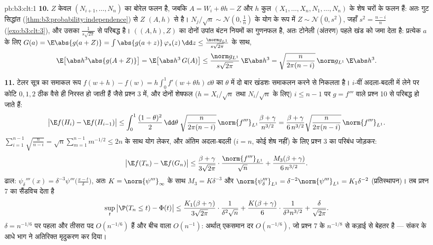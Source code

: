 \begin{solution}{pb:b3:clt:1}
\textbf{10.} $Z$ केवल $(N_{i+1}, \dots, N_n)$ का बोरेल फलन
है, जबकि $A = W_i + \theta h - Z$ और $h$  कुल
$(X_1, \dots, X_n, N_1, \dots, N_n)$ के शेष चरों के फलन हैं:
अतः गुट सिद्धांत (\cref{thm:b3:probability:independence})
से $Z$ $(A, h)$ से  है। 
$N_j/\sqrt n \sim \mathcal N(0, \frac1n)$ के योग के रूप में
$Z \sim \mathcal N(0, s^2)$, जहाँ $s^2 = \frac{n-i}n$
(\cref{exo:b3:clt:3}), और उसका 
$\frac1{s\sqrt{2\pi}}$ से परिबद्ध है। $((A, h), Z)$ का  दोनों उपांत बंटन नियमों का गुणनफल है, अतः टोनेली
(अंतरण) पहले खंड को जमा देता है: प्रत्येक $a$ के लिए $G(a) =
\E\abs{g(a + Z)} = \int\abs{g(a + z)}\,\varphi_s(z)\,\dd z
\leq \frac{\norm g_{L^1}}{s\sqrt{2\pi}}$ के साथ,
\[
\E\bigl[\abs h^3\abs{g(A + Z)}\bigr] =
\E\bigl[\abs h^3\,G(A)\bigr] \leq
\frac{\norm g_{L^1}}{s\sqrt{2\pi}}\,\E\abs h^3
= \sqrt{\frac{n}{2\pi(n-i)}}\,\norm g_{L^1}\,\E\abs h^3 .
\]

\textbf{11.} टेलर सूत्र का समाकल रूप $f(w + h) - f(w) =
h\int_0^1f'(w + \theta h)\,\dd\theta$ का $\theta$ में दो बार
खंडशः समाकलन करने से निकलता है। $i$-वीं अदला-बदली में
 लेने पर कोटि $0, 1, 2$ ठीक वैसे ही निरस्त हो जाती
हैं जैसे प्रश्न 3 में, और दोनों शेषफल ($h = X_i/\sqrt n$
तथा $N_i/\sqrt n$ के लिए) $i \leq n - 1$ पर $g = f'''$ वाले
प्रश्न 10 से परिबद्ध हो जाते हैं:
\[
\bigl|\E f(H_i) - \E f(H_{i-1})\bigr| \leq
\int_0^1\frac{(1-\theta)^2}2\,\dd\theta\;
\sqrt{\frac{n}{2\pi(n-i)}}\,\norm{f'''}_{L^1}
\frac{\beta + \gamma}{n^{3/2}}
= \frac{\beta + \gamma}{6\,n^{3/2}}
\sqrt{\frac{n}{2\pi(n-i)}}\,\norm{f'''}_{L^1} .
\]
$\sum_{i=1}^{n-1}\sqrt{\frac n{n-i}} =
\sqrt n\sum_{m=1}^{n-1}m^{-1/2} \leq 2n$ के साथ योग लेकर, और
अंतिम अदला-बदली ($i = n$, कोई  शेष नहीं) के लिए प्रश्न
3 का परिबंध जोड़कर:
\[
\bigl|\E f(T_n) - \E f(G_n)\bigr| \leq
\frac{\beta + \gamma}{3\sqrt{2\pi}}\cdot
\frac{\norm{f'''}_{L^1}}{\sqrt n} +
\frac{M_3(\beta + \gamma)}{6\,n^{3/2}} .
\]
ढाल: $\psi_\delta'''(x) =
\delta^{-3}\psi'''\bigl(\frac{x - t}\delta\bigr)$, अतः
$K = \norm{\psi'''}_\infty$ के साथ $M_3 = K\delta^{-3}$ और
$\norm{\psi_\delta'''}_{L^1} = \delta^{-2}
\norm{\psi'''}_{L^1} = K_1\delta^{-2}$ (प्रतिस्थापन)। तब
प्रश्न 7 का सैंडविच देता है
\[
\sup_t\,\bigl|\P(T_n \leq t) - \Phi(t)\bigr| \leq
\frac{K_1(\beta + \gamma)}{3\sqrt{2\pi}}\cdot
\frac1{\delta^2\sqrt n} +
\frac{K(\beta + \gamma)}{6}\cdot
\frac1{\delta^3n^{3/2}} + \frac\delta{\sqrt{2\pi}} .
\]
$\delta = n^{-1/6}$ पर पहला और तीसरा पद $O(n^{-1/6})$ हैं
और बीच वाला $O(n^{-1})$: अर्थात् एकसमान दर $O(n^{-1/6})$,
जो प्रश्न 7 के $n^{-1/8}$ से कड़ाई से बेहतर है --- संकर के
 आधे भाग ने अतिरिक्त मृदुकरण कर दिया।


\end{solution}
